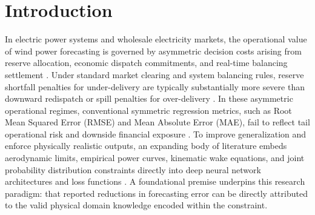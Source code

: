 \section{Introduction}
\label{sec:intro}

In electric power systems and wholesale electricity markets, the operational value of wind power forecasting is governed by asymmetric decision costs arising from reserve allocation, economic dispatch commitments, and real-time balancing settlement \cite{holttinen2021,weron2014}. Under standard market clearing and system balancing rules, reserve shortfall penalties for under-delivery are typically substantially more severe than downward redispatch or spill penalties for over-delivery \cite{zhang2014wind}. In these asymmetric operational regimes, conventional symmetric regression metrics, such as Root Mean Squared Error (RMSE) and Mean Absolute Error (MAE), fail to reflect tail operational risk and downside financial exposure \cite{lipton2019,pinson2007trading}. To improve generalization and enforce physically realistic outputs, an expanding body of literature embeds aerodynamic limits, empirical power curves, kinematic wake equations, and joint probability distribution constraints directly into deep neural network architectures and loss functions \cite{bastankhah2014new,karniadakis2021physics,raissi2019physics,s34_prx2023,pct2026}. A foundational premise underpins this research paradigm: that reported reductions in forecasting error can be directly attributed to the valid physical domain knowledge encoded within the constraint.


